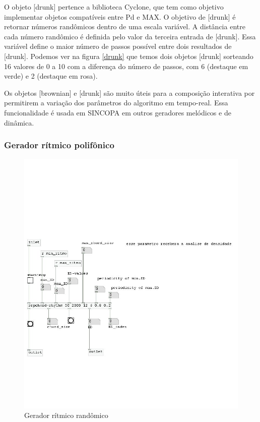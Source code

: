\documentclass{ppgmus}
\begin{document}
O objeto [drunk] pertence a biblioteca Cyclone, que tem como objetivo
implementar objetos compatíveis entre Pd e MAX. O objetivo de [drunk] é
retornar números randômicos dentro de uma escala variável. A distância
entre cada número randômico é definida pelo valor da terceira entrada
de [drunk]. Essa variável define o maior número de passos possível entre 
dois resultados de [drunk]. Podemos ver na figura \ref{drunk} que temos
dois objetos [drunk] sorteando 16 valores de 0 a 10 com a diferença do
número de passos, com 6 (destaque em verde) e 2 (destaque em rosa).

Os objetos [brownian] e [drunk] são muito úteis para a composição 
interativa por permitirem a variação dos parâmetros do algoritmo
em tempo-real. Essa funcionalidade é usada em SINCOPA em outros geradores
melódicos e de dinâmica.


\subsubsection{Gerador rítmico polifônico}


\begin{figure}[!ht]
\includegraphics[scale=.6]{gerador-ritmico3}
\caption{Gerador rítmico randômico}
\label{gera-ritmico3}
\end{figure}  
\end{document}
